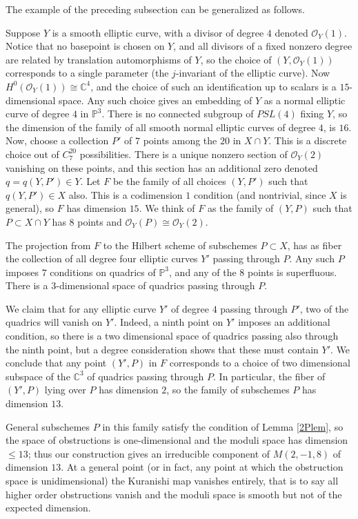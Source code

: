 \documentclass{amsart}
\theoremstyle{plain}
\numberwithin{equation}{section}
\begin{document}
The example of the preceding subsection can be generalized as follows. 

Suppose $Y$ is a smooth elliptic curve, with a divisor of degree $4$ denoted ${{\mathcal O}} _Y(1)$.
Notice that no basepoint is chosen on $Y$, and all divisors of a fixed nonzero degree
are related by translation automorphisms of $Y$, so the choice of $(Y,{{\mathcal O}} _Y(1))$ 
corresponds to a single parameter (the $j$-invariant of the elliptic curve).
Now $H^0({{\mathcal O}} _Y(1))\cong {{\mathbb C}} ^4$, and the choice of such an identification up to scalars
is a $15$-dimensional space. Any such choice gives an
embedding of $Y$ as a normal elliptic curve of degree $4$ in ${{\mathbb P}} ^3$.
There is no connected subgroup of $PSL(4)$ fixing $Y$, so the dimension of the family of
all smooth normal elliptic curves of degree $4$, is $16$. Now, choose a collection $P'$ of 
$7$ points among the $20$ in $X\cap Y$.
This is a discrete choice out of $C^{20}_7$ possibilities. 
There is a unique nonzero section of ${{\mathcal O}} _Y(2)$ vanishing on these points, 
and this section has an additional zero denoted $q=q(Y,P')\in Y$. Let $F$ be the
family of all choices $(Y,P')$ such that $q(Y,P')\in X$ also. This is a codimension $1$
condition (and nontrivial, since $X$ is general), so $F$ has dimension $15$. 
We think of $F$ as the family
of $(Y,P)$ such that $P\subset X\cap Y$ has $8$ points and ${{\mathcal O}} _Y(P)\cong {{\mathcal O}} _Y(2)$. 

The projection from $F$ to the Hilbert scheme of subschemes $P\subset X$,
has as fiber the collection of all degree four elliptic curves $Y'$ passing through $P$.
Any such $P$ imposes $7$ conditions on quadrics of ${{\mathbb P}} ^3$, and 
any of the $8$ points is superfluous. There is a $3$-dimensional space of quadrics
passing through $P$. 

We claim that for any elliptic curve $Y'$ of degree $4$ passing through $P'$,
two of the quadrics will vanish on $Y'$. Indeed, a ninth point on $Y'$  imposes
an additional condition, so there is a two dimensional space of quadrics passing
also through the ninth point, but a degree consideration shows that these must
contain $Y'$. We conclude that any point $(Y',P)$ in $F$ corresponds to a choice of
two dimensional subspace of the ${{\mathbb C}} ^3$ of quadrics passing through $P$.
In particular, the fiber of $(Y',P)$ lying over $P$ has dimension $2$, so the family
of subschemes $P$ has dimension $13$.

General subschemes $P$ in this family satisfy the condition of Lemma \ref{2Plem},
so the space of obstructions is one-dimensional and the moduli space has dimension
$\leq 13$; thus our construction gives an irreducible component of $M (2,-1,8)$
of dimension $13$. At a general point (or in fact, any point at which the
obstruction space is unidimensional) the Kuranishi map vanishes entirely, that is
to say all higher order obstructions vanish and the moduli space is smooth but not of
the expected dimension. 
\end{document}
